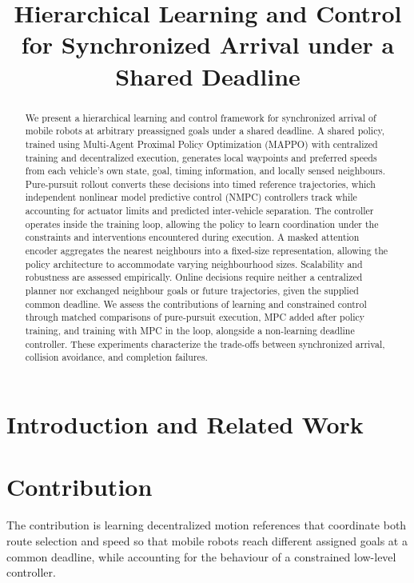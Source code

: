 \documentclass[11pt]{article}
\title{Hierarchical Learning and Control for Synchronized Arrival\newline
under a Shared Deadline}
\author{}
\date{}
\begin{document}
\maketitle

\begin{abstract}
We present a hierarchical learning and control framework for synchronized
arrival of mobile robots at arbitrary preassigned goals under a shared
deadline. A shared policy, trained using Multi-Agent Proximal Policy
Optimization (MAPPO) with centralized training and decentralized execution,
generates local waypoints and preferred speeds from each vehicle's own state,
goal, timing information, and locally sensed neighbours. Pure-pursuit rollout
converts these decisions into timed reference trajectories, which independent
nonlinear model predictive control (NMPC) controllers track while accounting
for actuator limits and predicted inter-vehicle separation. The controller
operates inside the training loop, allowing the policy to learn coordination
under the constraints and interventions encountered during execution. A
masked attention encoder aggregates the nearest neighbours into a fixed-size
representation, allowing the policy architecture to accommodate varying
neighbourhood sizes. Scalability and robustness are assessed empirically.
Online decisions require neither a centralized planner nor exchanged
neighbour goals or future trajectories, given the supplied common deadline.
We assess the contributions of learning and constrained control through
matched comparisons of pure-pursuit execution, MPC added after policy
training, and training with MPC in the loop, alongside a non-learning deadline
controller. These experiments characterize the trade-offs between synchronized
arrival, collision avoidance, and completion failures.
\end{abstract}

\section{Introduction and Related Work}
\label{sec:introduction}

\section{Contribution}
\label{sec:contribution}

The contribution is learning decentralized motion references that coordinate
both route selection and speed so that mobile robots reach different assigned
goals at a common deadline, while accounting for the behaviour of a
constrained low-level controller.
\end{document}
